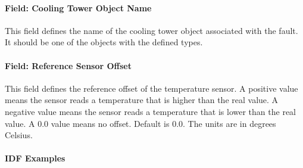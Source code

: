 \paragraph{Field: Cooling Tower Object Name}

This field defines the name of the cooling tower object associated with the fault. It should be one of the objects with the defined types.

\paragraph{Field: Reference Sensor Offset}

This field defines the reference offset of the temperature sensor. A positive value means the sensor reads a temperature that is higher than the real value. A negative value means the sensor reads a temperature that is lower than the real value. A 0.0 value means no offset. Default is 0.0. The units are in degrees Celsius.

\paragraph{IDF Examples}

